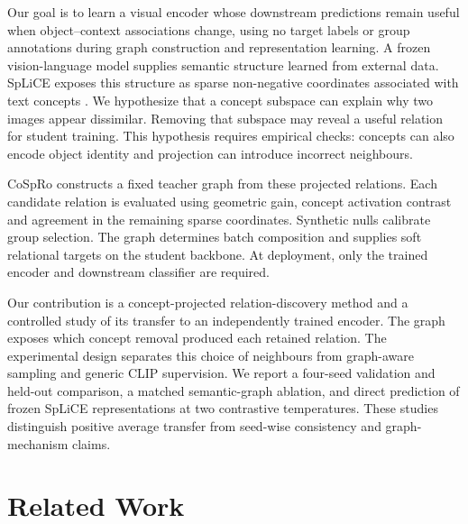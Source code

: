 \documentclass{article}
\begin{document}
Our goal is to learn a visual encoder whose downstream predictions remain useful
when object--context associations change, using no target labels or group
annotations during graph construction and representation learning. A frozen
vision-language model supplies semantic structure learned from external data.
SpLiCE exposes this structure as sparse non-negative coordinates associated with
text concepts \citep{bhalla2024splice}. We hypothesize that a concept subspace can
explain why two images appear dissimilar. Removing that subspace may reveal a
useful relation for student training. This hypothesis requires empirical checks:
concepts can also encode object identity and projection can introduce incorrect
neighbours.

CoSpRo constructs a fixed teacher graph from these projected relations.
Each candidate relation is evaluated using geometric gain, concept activation
contrast and agreement in the remaining sparse coordinates. Synthetic nulls
calibrate group selection. The graph determines batch composition and supplies
soft relational targets on the student backbone. At deployment, only the trained
encoder and downstream classifier are required.

Our contribution is a concept-projected relation-discovery method and a
controlled study of its transfer to an independently trained encoder. The graph
exposes which concept removal produced each retained relation. The experimental
design separates this choice of neighbours from graph-aware sampling and generic
CLIP supervision. We report a four-seed validation and held-out comparison,
a matched semantic-graph ablation, and direct prediction of frozen SpLiCE
representations at two contrastive temperatures. These studies distinguish
positive average transfer from seed-wise consistency and graph-mechanism claims.

\section{Related Work}
\end{document}
